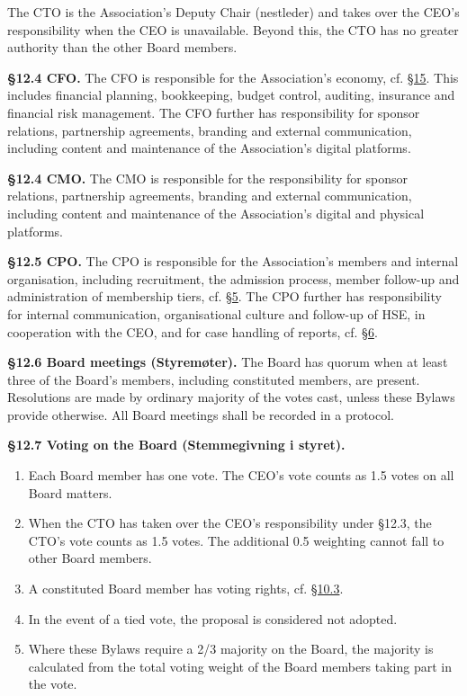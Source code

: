 \documentclass{../../../Common/Latex/Templates/rapport}
\begin{document}
The CTO is the Association's Deputy Chair (nestleder) and takes over the CEO's responsibility when the CEO is unavailable. Beyond this, the CTO has no greater authority than the other Board members.

\textbf{\S 12.4 CFO.}\label{bylaw:12.4-cfo} The CFO is responsible for the Association's economy, cf. \hyperref[bylaw:15]{\S 15}. This includes financial planning, bookkeeping, budget control, auditing, insurance and financial risk management. The CFO further has responsibility for sponsor relations, partnership agreements, branding and external communication, including content and maintenance of the Association's digital platforms.

\textbf{\S 12.4 CMO.}\label{bylaw:12.4-cmo} The CMO is responsible for the responsibility for sponsor relations, partnership agreements, branding and external communication, including content and maintenance of the Association's digital and physical platforms.

\textbf{\S 12.5 CPO.}\label{bylaw:12.5} The CPO is responsible for the Association's members and internal organisation, including recruitment, the admission process, member follow-up and administration of membership tiers, cf. \hyperref[bylaw:5]{\S 5}. The CPO further has responsibility for internal communication, organisational culture and follow-up of HSE, in cooperation with the CEO, and for case handling of reports, cf. \hyperref[bylaw:6]{\S 6}.

\textbf{\S 12.6 Board meetings (Styremøter).}\label{bylaw:12.6} The Board has quorum when at least three of the Board's members, including constituted members, are present. Resolutions are made by ordinary majority of the votes cast, unless these Bylaws provide otherwise. All Board meetings shall be recorded in a protocol.

\textbf{\S 12.7 Voting on the Board (Stemmegivning i styret).}\label{bylaw:12.7}
\begin{enumerate}
  \item Each Board member has one vote. The CEO's vote counts as 1.5 votes on all Board matters.
  \item When the CTO has taken over the CEO's responsibility under \S12.3, the CTO's vote counts as 1.5 votes. The additional 0.5 weighting cannot fall to other Board members.
  \item A constituted Board member has voting rights, cf. \hyperref[bylaw:10.3]{\S 10.3}.
  \item In the event of a tied vote, the proposal is considered not adopted.
  \item Where these Bylaws require a 2/3 majority on the Board, the majority is calculated from the total voting weight of the Board members taking part in the vote.
\end{enumerate}
\end{document}
